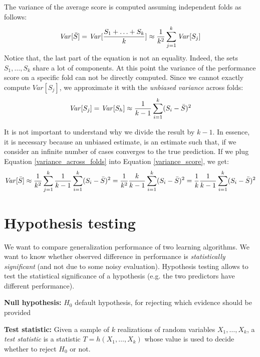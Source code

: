 The variance of the average score is computed assuming independent folds as follows:
\begin{equation}
	\label{variance_score}\mathit{Var}[\Bar{S}] = \mathit{Var}[\frac{S_{1}+\hdots+S_{k}}{k}
	] \approx \frac{1}{k^{2}}\sum_{j=1}^{k}\mathit{Var}[S_{j}]
\end{equation}
Notice that, the last part of the equation is not an equality. Indeed, the sets $S
_{1}, \hdots, S_{k}$ share a lot of components. At this point the variance of
the performance score on a specific fold can not be directly computed. Since we cannot
exactly compute $\mathit{Var}[S_{j}]$, we approximate it with the \textit{unbiased
variance} across folds:
\begin{equation}
	\label{variance_across_folds}\mathit{Var}[S_{j}] = \mathit{Var}[S_{h}] \approx
	\frac{1}{k-1}\sum_{i=1}^{k}(S_{i}- \Bar{S})^{2}
\end{equation}

It is not important to understand why we divide the result by $k-1$. In essence,
it is necessary because an unbiased estimate, is an estimate such that, if we consider
an infinite number of cases converges to the true prediction. If we plug
Equation \ref{variance_across_folds} into Equation \ref{variance_score}, we get:
\begin{equation}
	\mathit{Var}[\Bar{S}] \approx \frac{1}{k^{2}}\sum_{j=1}^{k}\frac{1}{k-1}\sum_{i=1}
	^{k}(S_{i}- \Bar{S})^{2}= \frac{1}{k^{2}}\frac{k}{k-1}\sum_{i=1}^{k}(S_{i}- \Bar
	{S})^{2}= \frac{1}{k}\frac{1}{k-1}\sum_{i=1}^{k}(S_{i}- \Bar{S})^{2}
\end{equation}

\section{Hypothesis testing}
We want to compare generalization performance of two learning algorithms. We
want to know whether observed difference in performance is \textit{statistically
significant} (and not due to some noisy evaluation). Hypothesis testing allows
to test the statistical significance of a hypothesis (e.g. the two predictors
have different performance).
\newline

\textbf{Null hypothesis:} $H_{0}$ default hypothesis, for rejecting which evidence
should be provided
\newline

\textbf{Test statistic:} Given a sample of $k$ realizations of random variables $X
_{1}, \hdots, X_{k}$, a \textit{test statistic} is a statistic $T=h(X_{1}, \hdots
,X_{k})$ whose value is used to decide whether to reject $H_{0}$ or not.
\newline

